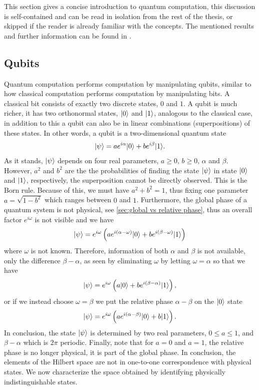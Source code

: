 \documentclass[a4paper,10pt,oneside]{book}
\theoremstyle{plain}
\theoremstyle{definition}
\theoremstyle{remark}
\DeclarePairedDelimiter\ket{\lvert}{\rangle}
\begin{document}
This section gives a concise introduction to quantum computation, this discussion is self-contained and can be read in isolation from the rest of the thesis, or skipped if the reader is already familiar with the concepts. The mentioned results and further information can be found in \cite{nielsen chuang}.



\subsection{Qubits}

Quantum computation performs computation by manipulating qubits, similar to how classical computation performs computation by manipulating bits. A classical bit consists of exactly two discrete states, $0$ and $1$. A qubit is much richer, it has two orthonormal states, $\ket{0}$ and $\ket{1}$, analogous to the classical case, in addition to this a qubit can also be in linear combinations (superpositions) of these states. In other words, a qubit is a two-dimensional quantum state
\begin{equation}
  \ket{\psi} = a e^{i\alpha} \ket{0} + b e^{i\beta} \ket{1}.
\end{equation}
As it stands, $\ket{\psi}$ depends on four real parameters, $a\ge 0$, $b\ge 0$, $\alpha$ and $\beta$. However, $a^2$ and $b^2$ are the the probabilities of finding the state $\ket{\psi}$ in state $\ket{0}$ and $\ket{1}$, respectively, the superposition cannot be directly observed. This is the Born rule. Because of this, we must have $a^2+b^2 = 1$, thus fixing one parameter $a = \sqrt{1-b^2}$ which ranges between $0$ and $1$. Furthermore, the global phase of a quantum system is not physical, see \cref{sec:global vs relative phase}, thus an overall factor $e^{i\omega}$ is not visible and we have
\begin{equation}
  \ket{\psi} = e^{i\omega}\left( a e^{i(\alpha-\omega)} \ket{0} + b e^{i(\beta-\omega)} \ket{1} \right)
\end{equation}
where $\omega$ is not known. Therefore, information of both $\alpha$ and $\beta$ is not available, only the difference $\beta-\alpha$, as seen by eliminating $\omega$ by letting $\omega = \alpha$ so that we have
\begin{equation}
  \ket{\psi} = e^{i\omega}\left( a\ket{0}+be^{i(\beta-\alpha)}\ket{1} \right),
\end{equation}
or if we instead choose $\omega = \beta$ we put the relative phase $\alpha-\beta$ on the $\ket{0}$ state
\begin{equation}
  \ket{\psi} = e^{i\omega}\left( ae^{i(\alpha-\beta)}\ket{0}+b\ket{1} \right).
\end{equation}
In conclusion, the state $\ket{\psi}$ is determined by two real parameters, $0 \le a \le 1$, and $\beta - \alpha$ which is $2\pi$ periodic. Finally, note that for $a = 0$ and $a = 1$, the relative phase is no longer physical, it is part of the global phase. In conclusion, the elements of the Hilbert space are not in one-to-one correspondence with physical states. We now characterize the space obtained by identifying physically indistinguishable states.
\end{document}
